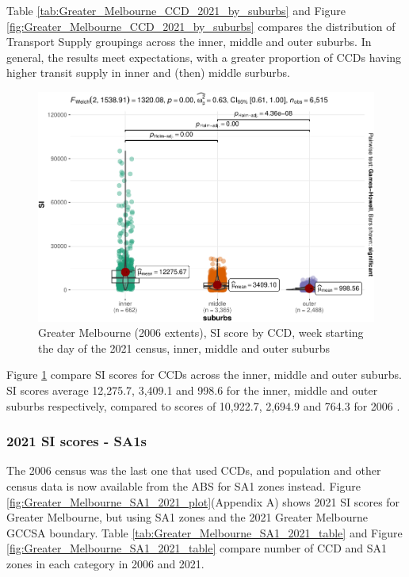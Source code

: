 \documentclass[preprint, 3p,
authoryear]{elsarticle} %
\begin{document}
Table \ref{tab:Greater_Melbourne_CCD_2021_by_suburbs} and Figure
\ref{fig:Greater_Melbourne_CCD_2021_by_suburbs} compares the
distribution of Transport Supply groupings across the inner, middle and
outer suburbs. In general, the results meet expectations, with a greater
proportion of CCDs having higher transit supply in inner and (then)
middle surburbs.

\begin{figure}
\includegraphics[width=1\linewidth]{Leveraging_GTFS_to_assess_transit_supply_Transport_Geography_files/figure-latex/Greater_Melbourne_CCD_2021_by_suburbs_SI_scores-1} \caption{Greater Melbourne (2006 extents), SI score by CCD, week starting the day of the 2021 census, inner, middle and outer suburbs}\label{fig:Greater_Melbourne_CCD_2021_by_suburbs_SI_scores}
\end{figure}

Figure \ref{fig:Greater_Melbourne_CCD_2021_by_suburbs_SI_scores} compare
SI scores for CCDs across the inner, middle and outer suburbs. SI scores
average 12,275.7, 3,409.1 and 998.6 for the inner, middle and outer
suburbs respectively, compared to scores of 10,922.7, 2,694.9 and 764.3
for 2006 \citep{currie2010identifying}.

\subsubsection{2021 SI scores - SA1s}\label{si-scores---sa1s}

The 2006 census was the last one that used CCDs, and population and
other census data is now available from the ABS for SA1 zones instead.
Figure \ref{fig:Greater_Melbourne_SA1_2021_plot}(Appendix A) shows 2021
SI scores for Greater Melbourne, but using SA1 zones and the 2021
Greater Melbourne GCCSA boundary. Table
\ref{tab:Greater_Melbourne_SA1_2021_table} and Figure
\ref{fig:Greater_Melbourne_SA1_2021_table} compare number of CCD and SA1
zones in each category in 2006 and 2021.
\end{document}
